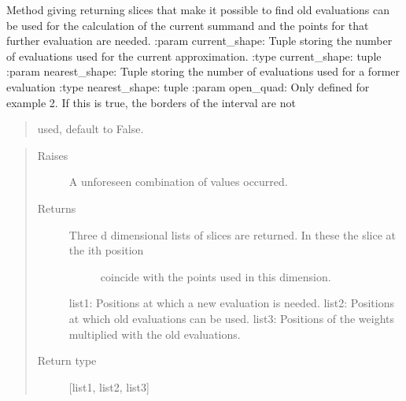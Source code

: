 \documentclass[letterpaper,10pt,english]{sphinxmanual}
\begin{document}
\begin{fulllineitems}
\label{\detokenize{index:Studienprojekt_Smolyak_qmc_one_point.slice_find}}
Method giving returning slices that make it possible to find old evaluations can be used
for the calculation of the current summand and the points for that further evaluation are needed.
:param current\_shape: Tuple storing the number of evaluations used for the current approximation.
:type current\_shape: tuple
:param nearest\_shape: Tuple storing the number of evaluations used for a former evaluation
:type nearest\_shape: tuple
:param open\_quad: Only defined for example 2. If this is true, the borders of the interval are not
\begin{quote}

used, default to False.
\end{quote}
\begin{quote}\begin{description}
\item[{Raises}] \leavevmode
{} \textendash{} A unforeseen combination of values occurred.

\item[{Returns}] \leavevmode
\begin{description}
\item[{Three d dimensional lists of slices are returned. In these the slice at the i\sphinxhyphen{}th position}] \leavevmode
coincide with the points used in this dimension.

\end{description}

list1: Positions at which a new evaluation is needed.
list2: Positions at which old evaluations can be used.
list3: Positions of the weights multiplied with the old evaluations.


\item[{Return type}] \leavevmode
{[}list1, list2, list3{]}

\end{description}\end{quote}

\end{fulllineitems}
\end{document}
